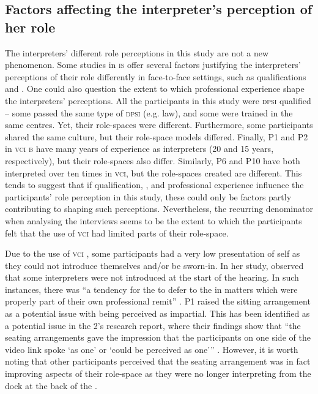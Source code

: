 \documentclass[output=paper]{langsci/langscibook}
\begin{document}
\subsection{Factors affecting the interpreter’s perception of her role}
The interpreters’ different role perceptions in this study are not a new phenomen\-on. Some studies in \textsc{is} offer several factors justifying the interpreters’ perceptions of their role differently in face-to-face settings, such as qualifications \citep{Martin2008} and  \citep{Merlini2009}. One could also question the extent to which professional experience shape the interpreters’ perceptions. All the participants in this study were \textsc{dpsi} qualified -- some passed the same type of \textsc{dpsi} (e.g. law), and some were trained in the same centres. Yet, their role-spaces were different. Furthermore, some participants shared the same culture, but their role-space models differed. Finally, P1 and P2 in \textsc{vci b} have many years of experience as  interpreters (20 and 15 years, respectively), but their role-spaces also differ. Similarly, P6 and P10 have both interpreted over ten times in \textsc{vci}, but the role-spaces created are different. This tends to suggest that if qualification, , and professional experience influence the participants’ role perception in this study, these could only be factors partly contributing to shaping such perceptions. Nevertheless, the recurring denominator when analysing the interviews seems to be the extent to which the participants felt that the use of \textsc{vci}  had limited parts of their role-space. 

Due to the use of \textsc{vci} , some participants had a very low presentation of self as they could not introduce themselves and/or be sworn-in. In her study, \citet{Fowler2013} observed that some interpreters were not introduced at the start of the hearing. In such instances, there was “a tendency for the  to defer to the  in matters which were properly part of their own professional remit” \citep[245]{Fowler2013}. P1 raised the sitting arrangement as a potential issue with being perceived as impartial. This has been identified as a potential issue in the  2’s research report, where their findings show that “the seating arrangements gave the impression that the participants on one side of the video link spoke ‘as one’ or ‘could be perceived as one’” \citep[53]{Braun2013}. However, it is worth noting that other participants perceived that the seating arrangement was in fact improving aspects of their role-space as they were no longer interpreting from the dock at the back of the .
\end{document}
